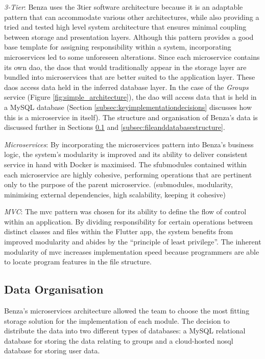 \documentclass{article}
\begin{document}
    \emph{3-Tier}: Benza uses the \gls{3tier} software architecture because it is an adaptable pattern that can accommodate various other architectures, while also providing a tried and tested high level system architecture that ensures minimal coupling between storage and presentation layers. Although this pattern provides a good base template for assigning responsibility within a system, incorporating \glspl{microservice} led to some unforeseen alterations. Since each \gls{microservice} contains its own \acrfull{dao}, the \acrshort{dao}s that would traditionally appear in the storage layer are bundled into \glspl{microservice} that are better suited to the application layer. These \acrshort{dao}s access data held in the inferred database layer. In the case of the \emph{Groups} service (Figure \ref{fig:simple_architecture}), the \gls{dao} will access data that is held in a MySQL database (Section \ref{subsec:keyimplementationdecisions} discusses how this is a \gls{microservice} in itself). The structure and organisation of Benza's data is discussed further in Sections \ref{subsec:dataorganisation} and \ref{subsec:fileanddatabasestructure}. \par
    
    \emph{Microservices}: By incorporating the \glspl{microservice} pattern into Benza's business logic, the system's modularity is improved and its ability to deliver consistent service in hand with Docker is maximised. The sfubmodules contained within each \gls{microservice} are highly cohesive, performing operations that are pertinent only to the purpose of the parent \gls{microservice}. (submodules, modularity, minimising external dependencies, high scalability, keeping it cohesive) \par
    
    \emph{MVC}: The \acrlong{mvc} pattern was chosen for its ability to define the flow of control within an application. By dividing responsibility for certain operations between distinct classes and files within the Flutter app, the system benefits from improved modularity and abides by the ``principle of least privilege''\cite{ploplecture}. The inherent modularity of \acrshort{mvc} increases implementation speed because programmers are able to locate program features in the file structure.\par

    \subsection{Data Organisation}
    \label{subsec:dataorganisation}
    Benza's \glspl{microservice} architecture allowed the team to choose the most fitting storage solution for the implementation of each module. The decision to distribute the data into two different types of databases: a MySQL relational database for storing the data relating to groups and a cloud-hosted \acrshort{nosql} database for storing user data. \par
    
\end{document}
